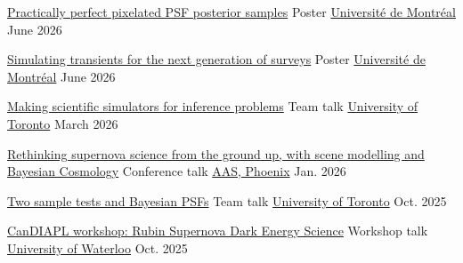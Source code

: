\begin{cvhonors}
  \cvhonor
    {\href{https://docs.google.com/drawings/d/15S-OE76RumrSolTbVImCueh18n5FesdpayE5uVNqP2M/edit?usp=sharing}{Practically perfect pixelated PSF posterior samples}} %
    {Poster} %
    {\href{https://www.umontreal.ca/en/}{Universit{\'e} de Montr{\'e}al}} %
    {June 2026} %

  \cvhonor
    {\href{https://docs.google.com/drawings/d/1ET49ylUsL77a-hyO4Zhk-hcdi5YfJ7_y6LJxedV731E/edit?usp=sharing}{Simulating transients for the next generation of surveys}} %
    {Poster} %
    {\href{https://www.umontreal.ca/en/}{Universit{\'e} de Montr{\'e}al}} %
    {June 2026} %

  \cvhonor
    {\href{https://docs.google.com/presentation/d/1BkuRmtO_ODWqKhRnNX9Vkahy8VqUTNIwKdFmeRYcVRc/edit?usp=sharing}{Making scientific simulators for inference problems}} %
    {Team talk} %
    {\href{https://astrostatuoft.com/}{University of Toronto}} %
    {March 2026} %

  \cvhonor
    {\href{https://docs.google.com/presentation/d/1s5eqtD1MYADeHSFEMl84Lq9sIj86ZjSbo-UFoisA2-4/edit?usp=sharing}{Rethinking supernova science from the ground up, with scene modelling and Bayesian Cosmology}} %
    {Conference talk} %
    {\href{https://aas.org/meetings/aas247}{AAS, Phoenix}} %
    {Jan. 2026} %

  \cvhonor
    {\href{https://docs.google.com/presentation/d/1_oOO8R0gCZ1Ii1QSfIew5YT876KxUYEvx76K4ad7N6M/edit?usp=sharing}{Two sample tests and Bayesian PSFs}} %
    {Team talk} %
    {\href{https://astrostatuoft.com/}{University of Toronto}} %
    {Oct. 2025} %
    
  \cvhonor
    {\href{https://docs.google.com/presentation/d/1f8UHgf8flTGkOmNw-y0guyFnnNeR-xiekkJI0Ovhw4c/edit?usp=sharing}{CanDIAPL workshop: Rubin Supernova Dark Energy Science}} %
    {Workshop talk} %
    {\href{https://uwaterloo.ca/}{University of Waterloo}} %
    {Oct. 2025} %


\end{cvhonors}
